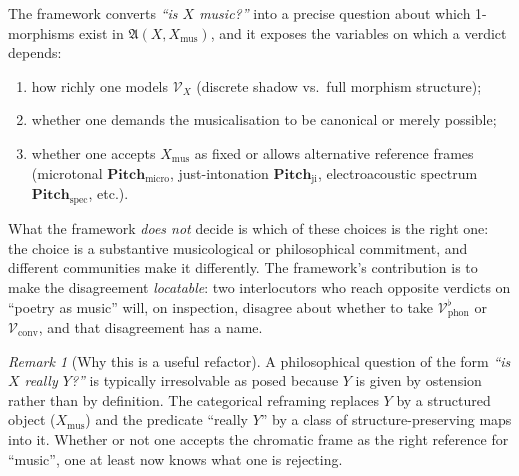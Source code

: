 \documentclass[11pt]{article}
\theoremstyle{definition}
\theoremstyle{plain}
\theoremstyle{remark}
\newtheorem*{remark}{Remark}
\newcommand{\V}{\mathcal{V}}
\newcommand{\Pitch}{\mathbf{Pitch}}
\newcommand{\Frame}{\mathfrak{A}}
\newcommand{\Xmus}{X_{\mathrm{mus}}}
\begin{document}
The framework converts \emph{``is $X$ music?''} into a precise
question about which 1-morphisms exist in $\Frame(X, \Xmus)$, and it
exposes the variables on which a verdict depends:
\begin{enumerate}[label=\textup{(\roman*)}, leftmargin=2em]
\item how richly one models $\V_X$ (discrete shadow vs.\ full
morphism structure);
\item whether one demands the musicalisation to be canonical or
merely possible;
\item whether one accepts $\Xmus$ as fixed or allows alternative
reference frames (microtonal $\Pitch_{\mathrm{micro}}$, just-intonation
$\Pitch_{\mathrm{ji}}$, electroacoustic spectrum
$\Pitch_{\mathrm{spec}}$, etc.).
\end{enumerate}

\noindent What the framework \emph{does not} decide is which of these
choices is the right one: the choice is a substantive musicological
or philosophical commitment, and different communities make it
differently. The framework's contribution is to make the disagreement
\emph{locatable}: two interlocutors who reach opposite verdicts on
``poetry as music'' will, on inspection, disagree about whether to
take $\V_{\mathrm{phon}}^\flat$ or $\V_{\mathrm{conv}}$, and that
disagreement has a name.

\begin{remark}[Why this is a useful refactor]
A philosophical question of the form \emph{``is $X$ really $Y$?''} is
typically irresolvable as posed because $Y$ is given by ostension
rather than by definition. The categorical reframing replaces $Y$ by
a structured object ($\Xmus$) and the predicate ``really $Y$'' by a
class of structure-preserving maps into it. Whether or not one
accepts the chromatic frame as the right reference for ``music'',
one at least now knows what one is rejecting.
\end{remark}
\end{document}
